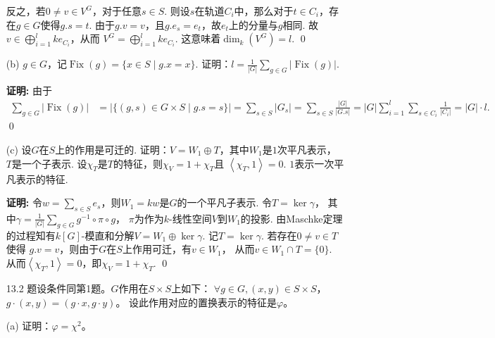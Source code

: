 \begin{enumerate}
            反之，若$0 \neq v \in V^{G}$，对于任意$s \in S$.
            则设$s$在轨道$C_{i}$中，那么对于$t \in C_{i}$，存在$g \in G$使得$g.s=t$.
            由于$g.v=v$，且$g.e_{s}=e_{t}$，故$e_{t}$上的分量与$g$相同. 
            故$v \in \bigoplus\limits_{i=1}^{l}ke_{C_{i}}$，从而
            $V^{G} = \bigoplus\limits_{i=1}^{l}ke_{C_{i}}$. 
            这意味着$\dim_{k}(V^{G}) = l$. \qed

        \item[(b)] $g \in G$，记$\operatorname{Fix}(g) = \{x \in S \mid g.x = x\}$.
            证明：$l = \frac{1}{|G|}\sum_{g \in G}|\operatorname{Fix}(g)|$.
        \item[\textbf{证明:}]
            由于
            \begin{equation*}\begin{aligned}
                \sum_{g \in G}|\operatorname{Fix}(g)|
                &= |\{(g,s) \in G \times S\mid g.s = s\}|
                = \sum_{s \in S}|G_{s}|
                = \sum_{s \in S}\frac{|G|}{|G.s|}
                = |G| \sum_{i=1}^{l}\sum_{s \in C_{i}}\frac{1}{|C_{i}|}
                = |G| \cdot l.
            \end{aligned}\end{equation*} 
            \qed

        \item[(c)] 设$G$在$S$上的作用是可迁的.
            证明：$V = W_{1} \oplus T$，其中$W_{1}$是$1$次平凡表示，
            $T$是一个子表示.
            设$\chi_{T}$是$T$的特征，则$\chi_{V} = 1 + \chi_{T}$且
            $\left<\chi_{T},1\right>=0$. $1$表示一次平凡表示的特征.
        \item[\textbf{证明:}]
            令$w = \sum\limits_{s \in S}e_{s}$，则$W_{1} = kw$是$G$的一个平凡子表示.
            令$T = \ker \gamma$，
            其中$\gamma = \frac{1}{|G|}\sum\limits_{g \in G}g^{-1} \circ \pi \circ g$，
            $\pi$为作为$k$-线性空间$V$到$W_{1}$的投影.
            由Maschke定理的过程知有$k[G]$-模直和分解$V = W_{1} \oplus \ker \gamma$.
            记$T = \ker \gamma$. 若存在$0 \neq v \in T$使得
            $g.v = v$，则由于$G$在$S$上作用可迁，有$v \in W_{1}$，
            从而$v \in W_{1} \cap T = \{0\}$.
            从而$\left<\chi_{T},1\right>=0$，即$\chi_{V} = 1 + \chi_{T}$. \qed

        \item[13.2] 题设条件同第1题。$G$作用在$S\times S$上如下：
        $\forall g\in G,(x,y)\in S\times S$，$g\cdot(x,y)=(g\cdot x,g\cdot y)$。
        设此作用对应的置换表示的特征是$\varphi$。
        \item[(a)] 证明：$\varphi=\chi^2$。


\end{enumerate}
